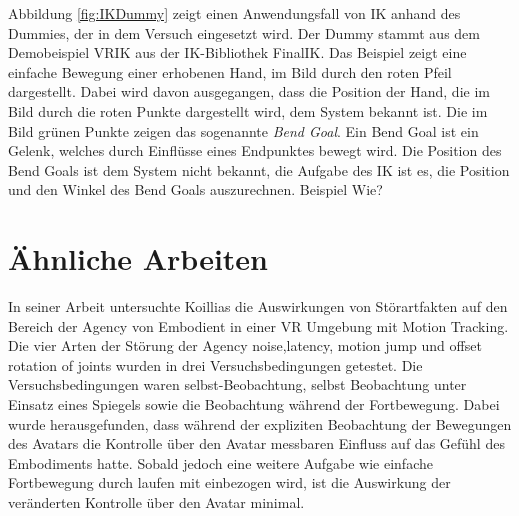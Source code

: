 Abbildung \ref{fig:IKDummy} zeigt einen Anwendungsfall von IK anhand des Dummies, der in dem Versuch eingesetzt wird. Der Dummy stammt aus dem Demobeispiel VRIK aus der IK-Bibliothek FinalIK. Das Beispiel zeigt eine einfache Bewegung einer erhobenen Hand, im Bild durch den roten Pfeil dargestellt.
Dabei wird davon ausgegangen, dass die Position der Hand, die im Bild durch die roten Punkte dargestellt wird, dem System bekannt ist. Die im Bild grünen Punkte zeigen das sogenannte \textit{Bend Goal}. Ein Bend Goal ist ein Gelenk, welches durch Einflüsse eines Endpunktes bewegt wird. Die Position des Bend Goals ist dem System nicht bekannt, die Aufgabe des IK ist es, die Position und den Winkel des Bend Goals auszurechnen. Beispiel Wie?


\section{Ähnliche Arbeiten}
In seiner Arbeit untersuchte Koillias \cite{Koilias2019} die Auswirkungen von Störartfakten auf den Bereich der Agency von Embodient in einer VR Umgebung mit Motion Tracking. Die vier Arten der Störung der Agency noise,latency, motion jump und offset rotation of joints wurden in drei Versuchsbedingungen getestet. Die Versuchsbedingungen waren selbst-Beobachtung, selbst Beobachtung unter Einsatz eines Spiegels sowie die Beobachtung während der Fortbewegung. Dabei wurde herausgefunden, dass während der expliziten Beobachtung der Bewegungen des Avatars die Kontrolle über den Avatar messbaren Einfluss auf das Gefühl des Embodiments hatte. Sobald jedoch eine weitere Aufgabe wie einfache Fortbewegung durch laufen mit einbezogen wird, ist die Auswirkung der veränderten Kontrolle über den Avatar minimal. 